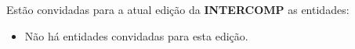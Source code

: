 
\begin{article}
	\label{art:convidadas}
	Estão convidadas para a atual edição da \textbf{INTERCOMP} as entidades:
	\begin{itemize}[noitemsep]
		\item Não há entidades convidadas para esta edição.
	\end{itemize}
\end{article}
